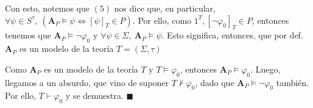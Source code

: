 \documentclass{article}
\begin{document}
Con esto, notemos que $(5)$ nos dice que, en particular, $\forall\psi\in S^\tau,\ (\mathbf{A}_P\vDash\psi\iff[\psi]_T\in P)$. Por ello, como $1^T, [\neg\varphi_0]_T\in P$, entonces tenemos que $\mathbf{A}_P\vDash \neg\varphi_0$ y $\forall\psi\in\Sigma,\ \mathbf{A}_P\vDash\psi$. Esto significa, entonces, que por def. $\mathbf{A}_P$ es un modelo de la teoría $T=(\Sigma,\tau)$

Como $\mathbf{A}_P$ es un modelo de la teoría $T$ y $T\vDash\varphi_0$, entonces $\mathbf{A}_P\vDash\varphi_0$. Luego, llegamos a un absurdo, que vino de suponer $T\nvdash\varphi_0$, dado que $\mathbf{A}_P\vDash\neg\varphi_0$ también. Por ello, $T\vdash\varphi_0$ y se demuestra. $\blacksquare$
\end{document}
